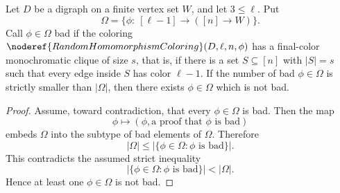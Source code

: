 \begin{helper}
Let \(D\) be a digraph on a finite vertex set \(W\), and let
\(3\le\ell\).  Put
\[
  \Omega=\{\phi:\ [\ell-1]\to([n]\to W)\}.
\]
Call \(\phi\in\Omega\) bad if the coloring
\(\noderef{RandomHomomorphismColoring}(D,\ell,n,\phi)\) has a final-color
monochromatic clique of size \(s\), that is, if there is a set
\(S\subseteq[n]\) with \(|S|=s\) such that every edge inside \(S\) has color
\(\ell-1\).  If the number of bad \(\phi\in\Omega\) is strictly smaller than
\(|\Omega|\), then there exists \(\phi\in\Omega\) which is not bad.
\end{helper}
\begin{proof}
Assume, toward contradiction, that every \(\phi\in\Omega\) is bad.  Then the
map
\[
  \phi\longmapsto (\phi,\text{a proof that }\phi\text{ is bad})
\]
embeds \(\Omega\) into the subtype of bad elements of \(\Omega\).  Therefore
\[
  |\Omega|\le |\{\phi\in\Omega:\phi\text{ is bad}\}|.
\]
This contradicts the assumed strict inequality
\[
  |\{\phi\in\Omega:\phi\text{ is bad}\}|<|\Omega|.
\]
Hence at least one \(\phi\in\Omega\) is not bad.
\end{proof}
